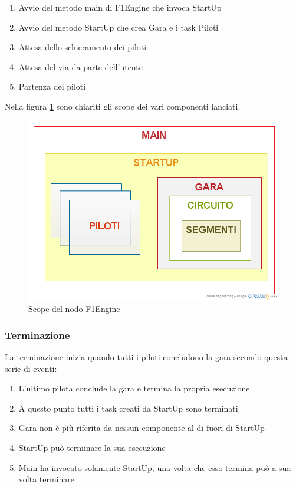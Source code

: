 \documentclass[a4paper,11pt, twoside]{book}
\begin{document}
	  \begin{enumerate}
	    \item Avvio del metodo main di F1Engine che invoca StartUp
	    \item Avvio del metodo StartUp che crea Gara e i task Piloti
	    \item Attesa dello schieramento dei piloti
	    \item Attesa del via da parte dell'utente
	    \item Partenza dei piloti
	  \end{enumerate}
	  
	  Nella figura \ref{Fig:Scope} sono chiariti gli scope dei vari componenti lanciati.
	  
	  \begin{figure}[ht]
	    \centering
	    \includegraphics[width=120mm]{./Immagini/Scope.png}
	    \caption{Scope del nodo F1Engine}
	    \label{Fig:Scope}
	  \end{figure}
  
	\subsubsection{Terminazione}
	  La terminazione inizia quando tutti i piloti concludono la gara secondo questa serie di eventi:
	  
	  \begin{enumerate}
	    \item L'ultimo pilota conclude la gara e termina la propria esecuzione
	    \item A questo punto tutti i task creati da StartUp sono terminati
	    \item Gara non è più riferita da nessun componente al di fuori di StartUp
	    \item StartUp può terminare la sua esecuzione
	    \item Main ha invocato solamente StartUp, una volta che esso termina può a sua volta terminare
	  \end{enumerate}
	  
\end{document}
